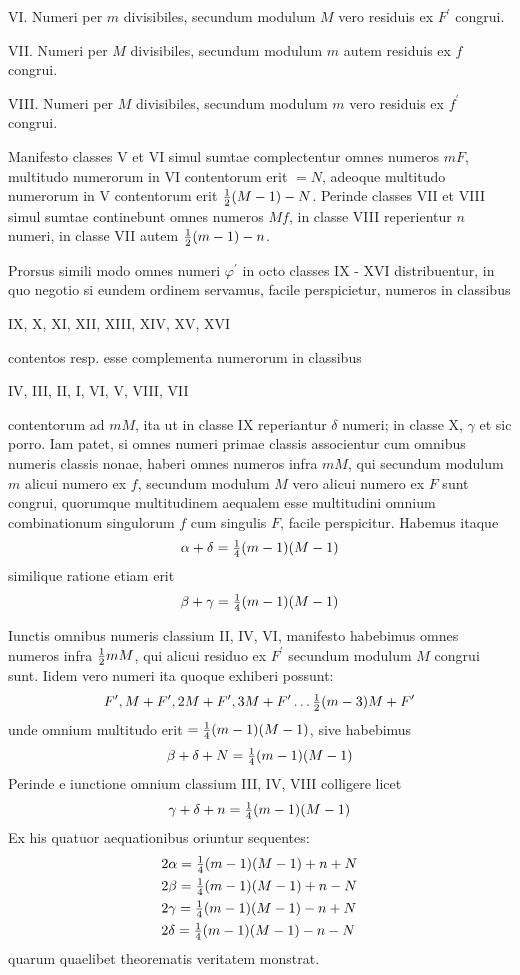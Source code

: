 \documentclass[twoside,12pt]{memoir}
\let\oldfrac\frac
\def\frac#1#2{\mathchoice{\tfrac{#1}{#2}}{\oldfrac{#1}{#2}}{\genfrac{}{}{}{2}{#1}{#2\mathstrut}}{\genfrac{}{}{}{3}{#1}{#2\mathstrut}}}
\begin{document}
VI. Numeri per \(m\) divisibiles, secundum modulum \(M\) vero residuis ex \(F^{\prime}\) congrui.
 
VII. Numeri per \(M\) divisibiles, secundum modulum \(m\) autem residuis ex \(f\) congrui.
 
VIII. Numeri per \(M\) divisibiles, secundum modulum \(m\) vero residuis ex \(f^{\prime}\) congrui.
 
Manifesto classes V et VI simul sumtae complectentur omnes numeros \(m F\), multitudo numerorum in VI contentorum erit \(=N\), adeoque multitudo numerorum in V contentorum erit \(\frac{1}{2}(M-1)-N\). Perinde classes VII et VIII simul sumtae continebunt omnes numeros \(M f\), in classe VIII reperientur \(n\) numeri, in classe VII autem \(\frac{1}{2}(m-1)-n\).

Prorsus simili modo omnes numeri \(\varphi^{\prime}\) in octo classes IX - XVI distribuentur, in quo negotio si eundem ordinem servamus, facile perspicietur, numeros in classibus
\begin{center} IX, X, XI, XII, XIII, XIV, XV, XVI \end{center}
contentos resp. esse complementa numerorum in classibus
\begin{center} IV, III, II, I, VI, V, VIII, VII \end{center}
contentorum ad \(m M\), ita ut in classe IX reperiantur \(\delta\) numeri; in classe X, \(\gamma\) et sic porro. Iam patet, si omnes numeri primae classis associentur cum omnibus numeris classis nonae, haberi omnes numeros infra \(m M\), qui secundum modulum \(m\) alicui numero ex \(f\), secundum modulum \(M\) vero alicui numero ex \(F\) sunt congrui, quorumque multitudinem aequalem esse multitudini omnium combinationum singulorum \(f\) cum singulis \(F\), facile perspicitur. Habemus itaque
\[\alpha+\delta=\frac{1}{4}(m-1)(M-1)\]\pagebreak%
similique ratione etiam erit
\[\beta+\gamma=\frac{1}{4}(m-1)(M-1)\]

Iunctis omnibus numeris classium II, IV, VI, manifesto habebimus omnes numeros infra \(\frac{1}{2} m M\), qui alicui residuo ex \(F^{\prime}\) secundum modulum \(M\) congrui sunt. Iidem vero numeri ita quoque exhiberi possunt:
\[F^{\prime}, M+F^{\prime}, 2 M+F^{\prime}, 3 M+F^{\prime} \ldots \frac{1}{2}(m-3) M+F^{\prime}\]
unde omnium multitudo erit \(=\frac{1}{4}(m-1)(M-1)\), sive habebimus
\[\beta+\delta+N=\frac{1}{4}(m-1)(M-1)\]
Perinde e iunctione omnium classium III, IV, VIII colligere licet
\[\gamma+\delta+n=\frac{1}{4}(m-1)(M-1)\]
Ex his quatuor aequationibus oriuntur sequentes:
\[\begin{aligned}
& 2 \alpha=\frac{1}{4}(m-1)(M-1)+n+N \\
& 2 \beta=\frac{1}{4}(m-1)(M-1)+n-N \\
& 2 \gamma=\frac{1}{4}(m-1)(M-1)-n+N \\
& 2 \delta=\frac{1}{4}(m-1)(M-1)-n-N
\end{aligned}\]
quarum quaelibet theorematis veritatem monstrat.
\end{document}
